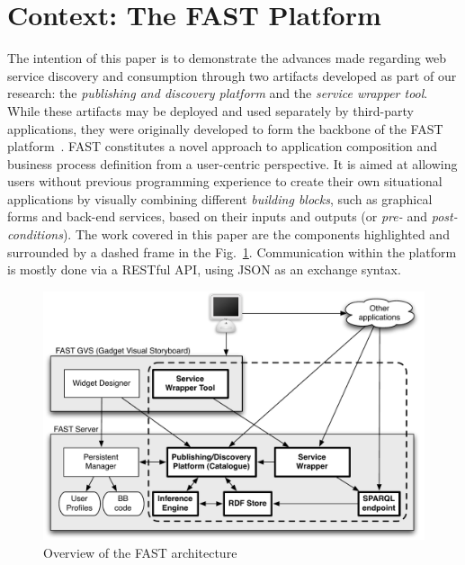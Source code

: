 
\section{Context: The FAST Platform}
\label{sec:use_case}

The intention of this paper is to demonstrate the advances made regarding web service discovery and consumption through two artifacts developed as part of our research: the \emph{publishing and discovery platform} and the \emph{service wrapper tool}. While these artifacts may be deployed and used separately by third-party applications, they were originally developed to form the backbone of the FAST platform~\cite{hoyer2009fast}.
FAST constitutes a novel approach to application composition and business process definition from a user-centric perspective. It is aimed at allowing users without previous programming experience to create their own situational applications by visually combining different \emph{building blocks}, such as graphical forms and back-end services, based on their inputs and outputs (or \emph{pre-} and \emph{post-conditions}). The work covered in this paper are the components highlighted and surrounded by a dashed frame in the Fig.~\ref{fig:fast_architecture}. Communication within the platform is mostly done via a RESTful API, using JSON as an exchange syntax.

\begin{figure}[ht]
  \begin{center}
    \includegraphics[width=\linewidth]{images/fast_architecture.pdf}
    \caption{Overview of the FAST architecture}
    \label{fig:fast_architecture}
  \end{center}
\end{figure}

